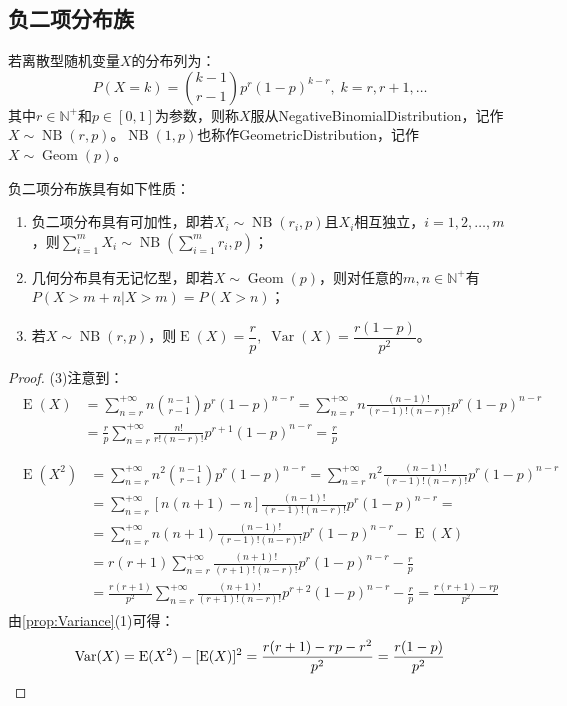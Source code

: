\subsection{负二项分布族}
\begin{definition}
	若离散型随机变量$X$的分布列为：
	\begin{equation*}
		P(X=k)=\binom{k-1}{r-1}p^r(1-p)^{k-r},\;k=r,r+1,\dots
	\end{equation*}
	其中$r\in\mathbb{N}^+$和$p\in[0,1]$为参数，则称$X$服从\gls{NegativeBinomialDistribution}，记作$X\sim\operatorname{NB}(r,p)$。$\operatorname{NB}(1,p)$也称作\gls{GeometricDistribution}，记作$X\sim\operatorname{Geom}(p)$。
\end{definition}
\begin{property}
	负二项分布族具有如下性质：
	\begin{enumerate}
		\item 负二项分布具有可加性，即若$X_i\sim\operatorname{NB}(r_i,p)$且$X_i$相互独立，$i=1,2,\dots,m$，则$\sum\limits_{i=1}^{m}X_i\sim\operatorname{NB}\left(\sum\limits_{i=1}^{m}r_i,p\right)$；
		\item 几何分布具有无记忆型，即若$X\sim\operatorname{Geom}(p)$，则对任意的$m,n\in\mathbb{N}^+$有$P(X>m+n|X>m)=P(X>n)$；
		\item 若$X\sim\operatorname{NB}(r,p)$，则$\operatorname{E}(X)=\dfrac{r}{p},\;\operatorname{Var}(X)=\dfrac{r(1-p)}{p^2}$。
	\end{enumerate}
\end{property}
\begin{proof}
	(3)注意到：
	\begin{gather*}
		\begin{aligned}
			\operatorname{E}(X)&=\sum_{n=r}^{+\infty}n\binom{n-1}{r-1}p^r(1-p)^{n-r}=\sum_{n=r}^{+\infty}n\frac{(n-1)!}{(r-1)!(n-r)!}p^r(1-p)^{n-r} \\
			&=\frac{r}{p}\sum_{n=r}^{+\infty}\frac{n!}{r!(n-r)!}p^{r+1}(1-p)^{n-r}=\frac{r}{p} \\
		\end{aligned} \\
		\begin{aligned}
			\operatorname{E}(X^2)&=\sum_{n=r}^{+\infty}n^2\binom{n-1}{r-1}p^r(1-p)^{n-r}=\sum_{n=r}^{+\infty}n^2\frac{(n-1)!}{(r-1)!(n-r)!}p^r(1-p)^{n-r} \\
			&=\sum_{n=r}^{+\infty}[n(n+1)-n]\frac{(n-1)!}{(r-1)!(n-r)!}p^r(1-p)^{n-r}= \\
			&=\sum_{n=r}^{+\infty}n(n+1)\frac{(n-1)!}{(r-1)!(n-r)!}p^r(1-p)^{n-r}-\operatorname{E}(X) \\
			&=r(r+1)\sum_{n=r}^{+\infty}\frac{(n+1)!}{(r+1)!(n-r)!}p^r(1-p)^{n-r}-\frac{r}{p} \\
			&=\frac{r(r+1)}{p^2}\sum_{n=r}^{+\infty}\frac{(n+1)!}{(r+1)!(n-r)!}p^{r+2}(1-p)^{n-r}-\frac{r}{p}=\frac{r(r+1)-rp}{p^2}
		\end{aligned}
	\end{gather*}
	由\cref{prop:Variance}(1)可得：
	\begin{equation*}
		\operatorname{Var}(X)=\operatorname{E}(X^2)-[\operatorname{E}(X)]^2=\frac{r(r+1)-rp-r^2}{p^2}=\frac{r(1-p)}{p^2}\qedhere
	\end{equation*}
\end{proof}

